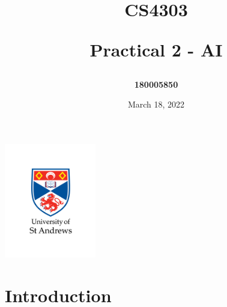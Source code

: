 \documentclass[a4paper,11pt]{article}
\title{CS4303 \item Practical 2 - AI}
\author{\bf{180005850}}
\date{March 18, 2022}
\begin{document}
\maketitle\thispagestyle{empty}

\begin{center}
\includegraphics[width=4cm]{images/01-standard-vertical-black-text.png}
\end{center}

\hrulefill

\renewcommand{\baselinestretch}{0.75}
\tableofcontents

\clearpage
{}

\setlength{\parskip}{0.75em}
\setlength{\parindent}{0em}

\onehalfspacing

\section{Introduction}
\end{document}
